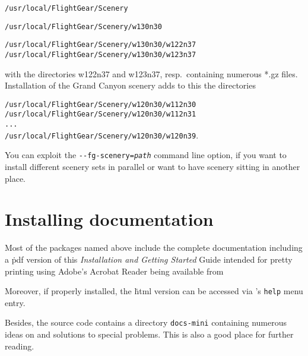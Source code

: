 \noindent
 \texttt{/usr/local/FlightGear/Scenery}

\noindent
 \texttt{/usr/local/FlightGear/Scenery/w130n30}

\noindent
 \texttt{/usr/local/FlightGear/Scenery/w130n30/w122n37}\\
 \texttt{/usr/local/FlightGear/Scenery/w130n30/w123n37}
 \medskip

\noindent 
 with the directories w122n37 and w123n37, resp.\ containing numerous *.gz
files. Installation of the Grand Canyon scenery adds to this the directories
\medskip

\noindent
 \texttt{/usr/local/FlightGear/Scenery/w120n30/w112n30}\\
 \texttt{/usr/local/FlightGear/Scenery/w120n30/w112n31}\\
 \texttt{...}\\
 \texttt{/usr/local/FlightGear/Scenery/w120n30/w120n39}.
 \medskip

You can exploit the \texttt{-$ $-fg-scenery={\it path}} command line option, if you want to install different scenery sets in parallel or want to have scenery sitting in another place.

\section{Installing documentation}

Most of the packages named above include the complete \FlightGear{} documentation
including a \.pdf version of this \textit{Installation and Getting Started} Guide intended
for pretty printing using Adobe's Acrobat Reader being available from
 \medskip

 \medskip

 \noindent
 Moreover, if properly installed, the \.html version can be accessed via
\FlightGear{}'s \texttt{help} menu entry.

Besides, the source code contains a directory \texttt{docs-mini} containing numerous
ideas on and solutions to special problems. This is also a good place for further
reading.

